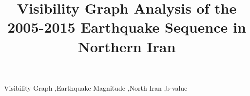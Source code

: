 \documentclass[a4paper,review]{elsarticle}
\begin{document}
\begin{frontmatter}

\title{Visibility Graph Analysis of the 2005-2015 Earthquake Sequence in Northern Iran}





\begin{keyword}
Visibility Graph \sep Earthquake Magnitude \sep North Iran \sep b-value 



\end{keyword}

\end{frontmatter}















\end{document}
